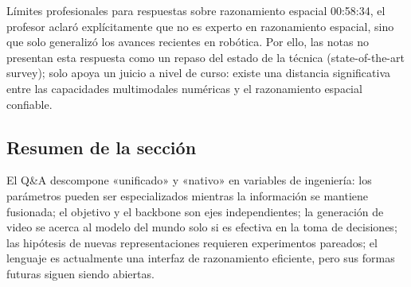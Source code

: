 
\begin{warningbox}{Límites profesionales para respuestas sobre razonamiento espacial}
00:58:34, el profesor aclaró explícitamente que no es experto en razonamiento espacial, sino que solo generalizó los avances recientes en robótica. Por ello, las notas no presentan esta respuesta como un repaso del estado de la técnica (state-of-the-art survey); solo apoya un juicio a nivel de curso: existe una distancia significativa entre las capacidades multimodales numéricas y el razonamiento espacial confiable.
\end{warningbox}

\subsection{Resumen de la sección}

El Q\&A descompone «unificado» y «nativo» en variables de ingeniería: los parámetros pueden ser especializados mientras la información se mantiene fusionada; el objetivo y el backbone son ejes independientes; la generación de video se acerca al modelo del mundo solo si es efectiva en la toma de decisiones; las hipótesis de nuevas representaciones requieren experimentos pareados; el lenguaje es actualmente una interfaz de razonamiento eficiente, pero sus formas futuras siguen siendo abiertas.
